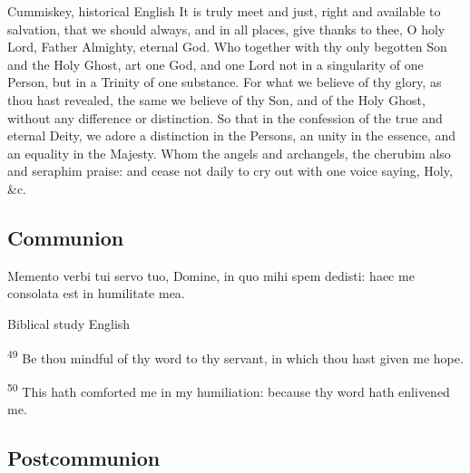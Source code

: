 \begin{englishwitness}{Cummiskey, historical English}
It is truly meet and just, right and available to salvation, that we should always, and in all places, give thanks to thee, O holy Lord, Father Almighty, eternal God. Who together with thy only begotten Son and the Holy Ghost, art one God, and one Lord not in a singularity of one Person, but in a Trinity of one substance. For what we believe of thy glory, as thou hast revealed, the same we believe of thy Son, and of the Holy Ghost, without any difference or distinction. So that in the confession of the true and eternal Deity, we adore a distinction in the Persons, an unity in the essence, and an equality in the Majesty. Whom the angels and archangels, the cherubim also and seraphim praise: and cease not daily to cry out with one voice saying, Holy, \&c.
\end{englishwitness}


\subsection{Communion}\label{proper-communion}


\begin{latinproper}
Memento verbi tui servo tuo, Domine, in quo mihi spem dedisti: haec me consolata est in humilitate mea.
\end{latinproper}

\begin{englishwitness}{Biblical study English}

\textsuperscript{49} Be thou mindful of thy word to thy servant, in which thou hast given me hope.

\textsuperscript{50} This hath comforted me in my humiliation: because thy word hath enlivened me.

\end{englishwitness}


\subsection{Postcommunion}\label{proper-postcommunion}

